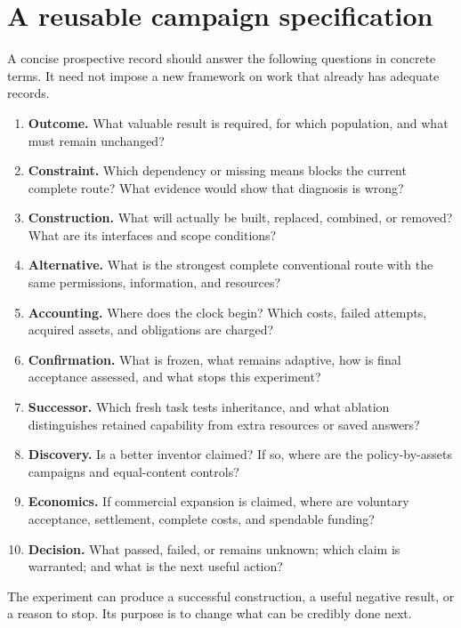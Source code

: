 \documentclass[11pt,letterpaper]{article}
\theoremstyle{remark}\newtheorem{remark}{Remark}[section]
\begin{document}
\section{A reusable campaign specification}\label{app:contract}
A concise prospective record should answer the following questions in concrete terms.
It need not impose a new framework on work that already has adequate records.
\begin{enumerate}
 \item \textbf{Outcome.} What valuable result is required, for which population, and what must remain unchanged?
 \item \textbf{Constraint.} Which dependency or missing means blocks the current complete route? What evidence would show that diagnosis is wrong?
 \item \textbf{Construction.} What will actually be built, replaced, combined, or removed? What are its interfaces and scope conditions?
 \item \textbf{Alternative.} What is the strongest complete conventional route with the same permissions, information, and resources?
 \item \textbf{Accounting.} Where does the clock begin? Which costs, failed attempts, acquired assets, and obligations are charged?
 \item \textbf{Confirmation.} What is frozen, what remains adaptive, how is final acceptance assessed, and what stops this experiment?
 \item \textbf{Successor.} Which fresh task tests inheritance, and what ablation distinguishes retained capability from extra resources or saved answers?
 \item \textbf{Discovery.} Is a better inventor claimed? If so, where are the policy-by-assets campaigns and equal-content controls?
 \item \textbf{Economics.} If commercial expansion is claimed, where are voluntary acceptance, settlement, complete costs, and spendable funding?
 \item \textbf{Decision.} What passed, failed, or remains unknown; which claim is warranted; and what is the next useful action?
\end{enumerate}
The experiment can produce a successful construction, a useful negative result, or a reason to stop.
Its purpose is to change what can be credibly done next.

\clearpage


\end{document}

